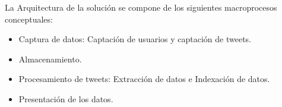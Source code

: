 La Arquitectura de la solución se compone de los siguientes macroprocesos conceptuales: 

\begin{itemize}
	\item Captura de datos: Captación de usuarios y captación de tweets.
	\item Almacenamiento.
	\item Procesamiento de tweets: Extracción de datos e Indexación de datos.
	\item Presentación de los datos.
\end{itemize}

